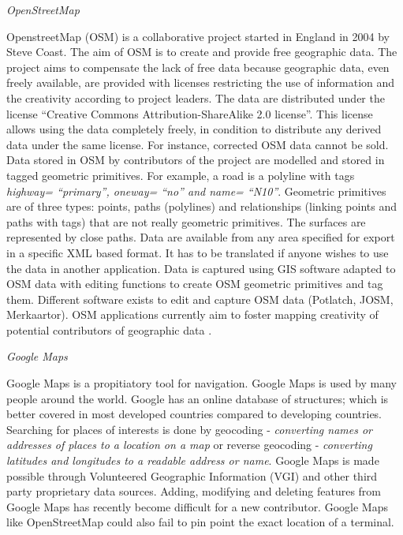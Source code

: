 \textit{OpenStreetMap}

OpenstreetMap (OSM) is a collaborative project started in England in 2004 by Steve Coast. The aim of OSM is to create and provide free geographic data. The project aims to compensate the lack of free data because geographic data, even freely available, are provided with licenses restricting the use of information and the creativity according to project leaders. The data are distributed under the license “Creative Commons Attribution-ShareAlike 2.0 license”. This license allows using the data completely freely, in condition to distribute any derived data under the same license. For instance, corrected OSM data cannot be sold.
Data stored in OSM by contributors of the project are modelled and stored in tagged geometric primitives. For example, a road is a polyline with tags \textit{highway= “primary”, oneway= “no” and name= “N10”}. Geometric primitives are of three types: points, paths (polylines) and relationships (linking points and paths with tags) that are not really geometric primitives. The surfaces are represented by close paths. Data are available from any area specified for export in a specific XML based format. It has to be translated if anyone wishes to use the data in another application. Data is captured using GIS software adapted to OSM data with editing functions to create OSM geometric primitives and tag them. Different software exists to edit and capture OSM data (Potlatch, JOSM, Merkaartor). OSM applications currently aim to foster mapping creativity of potential contributors of geographic data \citep{girres_quality_2010}.

\textit{Google Maps}

Google Maps is a propitiatory tool for navigation. Google Maps is used by many people around the world. Google has an online database of structures; which is better covered in most developed countries compared to developing countries. Searching for places of interests is done by geocoding - \textit{converting names or addresses of places to a location on a map} or reverse geocoding - \textit{converting latitudes and longitudes to a readable address or name}. Google Maps is made possible through Volunteered Geographic Information (VGI) and other third party proprietary data sources. Adding, modifying and deleting features from Google Maps has recently become difficult for a new contributor. Google Maps like OpenStreetMap could also fail to pin point the exact location of a terminal.


